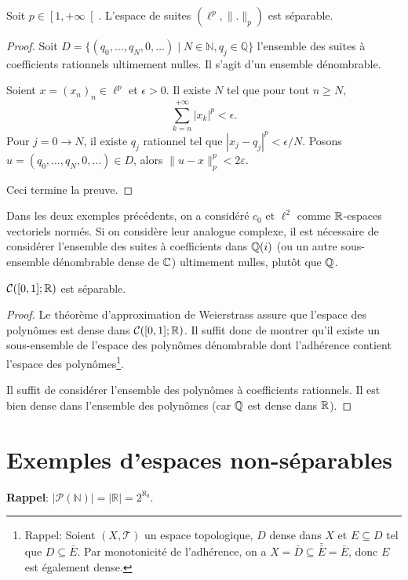\begin{ex}
  Soit $p \in \left[1, +\infty\right[$.
  L'espace de suites $(\ell^p, \|.\|_p)$ est séparable.
\end{ex}
\begin{proof}
  Soit $D = \{(q_0, \ldots, q_N, 0, \ldots)\mid
  N\in\mathbb N, q_j \in\mathbb Q\}$ l'ensemble des suites à coefficients
  rationnels ultimement nulles. Il s'agit d'un ensemble dénombrable.

  Soient $x = (x_n)_n\in \ell ^p$ et $\epsilon >0$. Il existe $N$ tel que
  pour tout $n \geq N$,
  $$\sum_{k=n}^{+\infty}|x_k|^p < \epsilon.$$
  Pour $j = 0 \to N$, il existe $q_j$ rationnel tel que
  $|x_j-q_j|^p<\epsilon/N$. Posons $u=(q_0, \ldots, q_N, 0, \ldots)\in D$, alors
  $\|u-x\|^p_p<2\varepsilon$.

  Ceci termine la preuve.
\end{proof}

\begin{rem}
  Dans les deux exemples précédents, on a considéré $c_0$ et $\ell^2$
  comme $\mathbb{R}$-espaces vectoriels normés. Si on considère leur analogue
  complexe, il est nécessaire de considérer l'ensemble des suites à
  coefficients dans $\mathbb{Q}(i)$ (ou un autre sous-ensemble dénombrable dense
  de $\mathbb{C}$) ultimement nulles, plutôt que $\mathbb{Q}$.
\end{rem}

\begin{ex}
  $\mathcal C([0, 1]; \mathbb{R})$ est séparable.
\end{ex}
\begin{proof}
  Le théorème d'approximation de Weierstrass assure que l'espace des polynômes
  est dense dans $\mathcal C([0, 1]; \mathbb{R})$. Il suffit donc de montrer qu'il
  existe un sous-ensemble de l'espace des polynômes dénombrable dont l'adhérence
  contient l'espace des polynômes\footnote{Rappel: Soient $(X, \mathcal T)$ un
    espace topologique, $D$ dense dans $X$ et $E\subseteq D$ tel
    que $D\subseteq \bar E$. Par monotonicité de l'adhérence, on a
    $X = \bar D \subseteq \bar{\bar E} =\bar E$, donc $E$ est également dense.}.

  Il suffit de considérer l'ensemble des polynômes à coefficients
  rationnels. Il est bien dense dans l'ensemble des polynômes (car $\mathbb{Q}$
  est dense dans $\mathbb{R}$).
\end{proof}
\section{Exemples d'espaces non-séparables}
\textbf{Rappel}: $|\mathcal P (\mathbb N)| = |\mathbb R| = 2^{\aleph_0}$.

